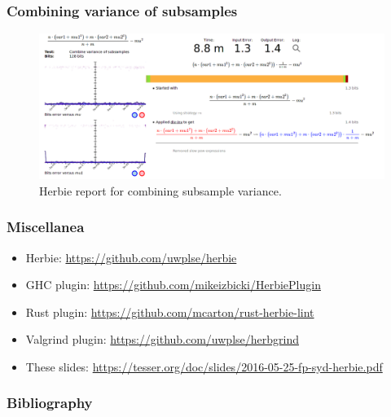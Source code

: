 \documentclass{beamer}
\newcommand\Bibfont{\fontsize{6pt}{7.2}\selectfont}
\begin{document}
\begin{frame}
  \frametitle{Combining variance of subsamples}
  \begin{figure}
    \includegraphics[scale=0.24]{img/subsamples}
    \caption{Herbie report for combining subsample variance.}
  \end{figure}
\end{frame}


\begin{frame}
  \frametitle{Miscellanea}
  \begin{itemize}
  \item Herbie: \url{https://github.com/uwplse/herbie}
  \item GHC plugin: \url{https://github.com/mikeizbicki/HerbiePlugin}
  \item Rust plugin: \url{https://github.com/mcarton/rust-herbie-lint}
  \item Valgrind plugin: \url{https://github.com/uwplse/herbgrind}
  \item These slides: \url{https://tesser.org/doc/slides/2016-05-25-fp-syd-herbie.pdf}
  \end{itemize}
\end{frame}


\begin{frame}
\frametitle{Bibliography}

\Bibfont



\end{frame}
\end{document}
